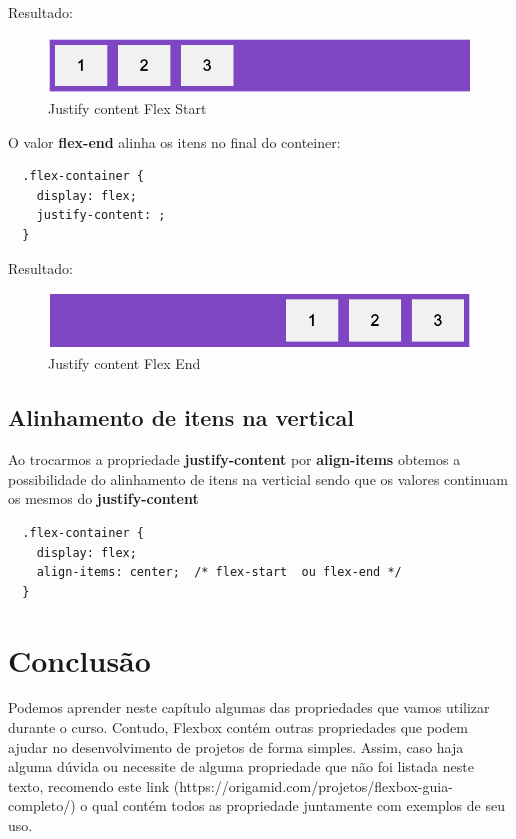 Resultado: 

\begin{figure}[H]
  \centering
  \includegraphics[scale=0.4]{imagens/justify-content-flex-start.png}
  \caption{Justify content Flex Start}
  \label{fig:model-flexbox}
\end{figure}

O valor \textbf{flex-end} alinha os itens no final do conteiner:

\begin{lstlisting}
  .flex-container {
    display: flex;
    justify-content: ;
  } 
\end{lstlisting}

Resultado: 

\begin{figure}[H]
  \centering
  \includegraphics[scale=0.4]{imagens/justify-content-flex-end.png}
  \caption{Justify content Flex End}
  \label{fig:model-flexbox}
\end{figure}

\subsection{Alinhamento de itens na vertical}

Ao trocarmos a propriedade \textbf{justify-content} por \textbf{align-items} obtemos a possibilidade do alinhamento de itens na verticial sendo que os valores continuam os mesmos do \textbf{justify-content}

\begin{lstlisting}
  .flex-container {
    display: flex;
    align-items: center;  /* flex-start  ou flex-end */
  } 
\end{lstlisting}

\section{Conclusão}

Podemos aprender neste capítulo algumas das propriedades que vamos utilizar durante o curso. Contudo, Flexbox contém outras propriedades que podem ajudar no desenvolvimento de projetos de forma simples. Assim, caso haja alguma dúvida ou necessite de alguma propriedade que não foi listada neste texto, recomendo este link (https://origamid.com/projetos/flexbox-guia-completo/) o qual contém todos as  propriedade juntamente com exemplos de seu uso.